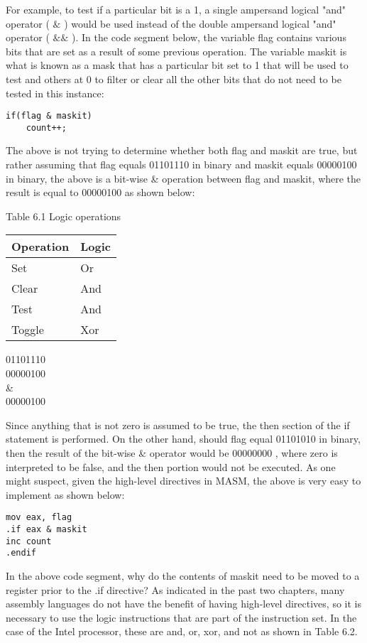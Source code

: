 \documentclass[10pt]{article}
\begin{document}
For example, to test if a particular bit is a 1, a single ampersand logical "and" operator ( $\&$ ) would be used instead of the double ampersand logical "and" operator ( $\& \&$ ). In the code segment below, the variable flag contains various bits that are set as a result of some previous operation. The variable maskit is what is known as a mask that has a particular bit set to 1 that will be used to test and others at 0 to filter or clear all the other bits that do not need to be tested in this instance:

\begin{verbatim}
if(flag & maskit)
    count++;
\end{verbatim}

The above is not trying to determine whether both flag and maskit are true, but rather assuming that flag equals 01101110 in binary and maskit equals 00000100 in binary, the above is a bit-wise \& operation between flag and maskit, where the result is equal to 00000100 as shown below:

Table 6.1 Logic operations

\begin{center}
\begin{tabular}{|ll|}
\hline
Operation & Logic \\
\hline
Set & Or \\
Clear & And \\
Test & And \\
Toggle & Xor \\
\hline
\end{tabular}
\end{center}

01101110\\
00000100\\
\&\\
00000100

Since anything that is not zero is assumed to be true, the then section of the if statement is performed. On the other hand, should flag equal 01101010 in binary, then the result of the bit-wise \& operator would be 00000000 , where zero is interpreted to be false, and the then portion would not be executed. As one might suspect, given the high-level directives in MASM, the above is very easy to implement as shown below:

\begin{verbatim}
mov eax, flag
.if eax & maskit
inc count
.endif
\end{verbatim}

In the above code segment, why do the contents of maskit need to be moved to a register prior to the .if directive? As indicated in the past two chapters, many assembly languages do not have the benefit of having high-level directives, so it is necessary to use the logic instructions that are part of the instruction set. In the case of the Intel processor, these are and, or, xor, and not as shown in Table 6.2.
\end{document}
